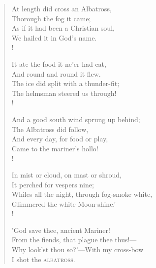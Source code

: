 \documentclass[11pt,twoside]{book}
\begin{document}
\begin{verse}
At length did cross an Albatross, \\
Thorough the fog it came; \\
As if it had been a Christian soul, \\
We hailed it in God's name. \\!

It ate the food it ne'er had eat, \\
And round and round it flew. \\
The ice did split with a thunder-fit; \\
The helmsman steered us through! \\!

And a good south wind sprung up behind; \\
The Albatross did follow, \\
And every day, for food or play, \\
Came to the mariner's hollo! \\!

In mist or cloud, on mast or shroud, \\
It perched for vespers nine; \\
Whiles all the night, through fog-smoke white, \\
Glimmered the white Moon-shine.' \\!

'God save thee, ancient Mariner! \\
From the fiends, that plague thee thus!— \\
Why look'st thou so?'—With my cross-bow \\
I shot the \textsc{albatross}.

\end{verse}
\end{document}
